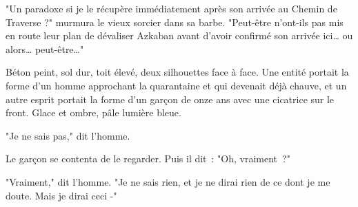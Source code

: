 "Un paradoxe si je le récupère immédiatement après son arrivée au Chemin de Traverse ?" murmura le vieux sorcier dans sa barbe. "Peut-être n'ont-ils pas mis en route leur plan de dévaliser Azkaban avant d'avoir confirmé son arrivée ici… ou alors… peut-être…"

\later

Béton peint, sol dur, toit élevé, deux silhouettes face à face. Une entité portait la forme d'un homme approchant la quarantaine et qui devenait déjà chauve, et un autre esprit portait la forme d'un garçon de onze ans avec une cicatrice sur le front. Glace et ombre, pâle lumière bleue.

"Je ne sais pas," dit l'homme.

Le garçon se contenta de le regarder. Puis il dit~: "Oh, vraiment~?"

"Vraiment," dit l'homme. "Je ne sais rien, et je ne dirai rien de ce dont je me doute. Mais je dirai ceci -" 

